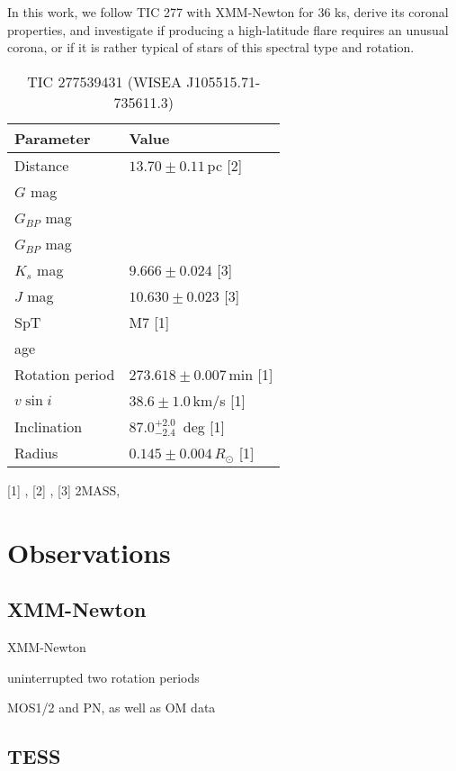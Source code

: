 \documentclass[twocolumn]{aastex631}
\begin{document}
In this work, we follow TIC 277 with XMM-Newton for 36 ks, derive its coronal properties, and investigate if producing a high-latitude flare requires an unusual corona, or if it is rather typical of stars of this spectral type and rotation.


\begin{table}

    \caption{TIC 277539431 (WISEA J105515.71-735611.3)}
    \begin{tabular}{ll}\hline 
         Parameter & Value  \\\hline
         Distance & $13.70\pm0.11\,$pc [2] \\
         $G$ mag & \\
         $G_{BP}$ mag & \\
         $G_{BP}$ mag & \\
         $K_s$ mag & $9.666 \pm 0.024$ [3]\\
         $J$ mag & $10.630 \pm 0.023$ [3] \\
         SpT & M7 [1]\\
         age & \\
         Rotation period & $273.618 \pm 0.007\,$min [1]\\
         $v\sin i$ & $38.6\pm1.0\,$km/s [1] \\
         Inclination & $87.0^{+2.0}_{-2.4}\,$ deg [1]\\
         Radius & $0.145\pm0.004\,R_\odot$ [1]\\\hline
        
    \end{tabular}
    \newline\footnotesize
    [1] \citet{ilin2021giant}, [2] \citet{bailer-jones2018estimating}, [3] 2MASS, \citet{skrutskie2006two}
    \label{tab:modelparams}
\end{table}


\section{Observations}

\subsection{XMM-Newton}
XMM-Newton

uninterrupted two rotation periods

MOS1/2 and PN, as well as OM data

\subsection{TESS}
\end{document}
